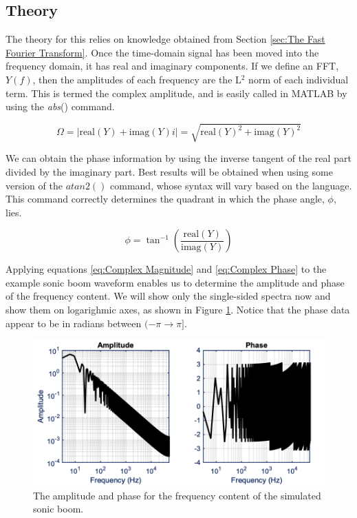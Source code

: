 \subsection{Theory}

The theory for this relies on knowledge obtained from Section \ref{sec:The Fast Fourier Transform}. Once the time-domain signal has been moved into the frequency domain, it has real and imaginary components. If we define an FFT, $Y(f)$, then the amplitudes of each frequency are the L$^2$ norm of each individual term. This is termed the complex amplitude, and is easily called in MATLAB by using the \textit{abs}() command.

\begin{equation} \label{eq:Complex Magnitude}
    \Omega = |\text{real}(Y) + \text{imag}(Y) i| = \sqrt{\text{real}(Y)^2 + \text{imag}(Y)^2}
\end{equation}

We can obtain the phase information by using the inverse tangent of the real part divided by the imaginary part. Best results will be obtained when using some version of the $atan2()$ command, whose syntax will vary based on the language. This command correctly determines the quadrant in which the phase angle, $\phi$, lies.

\begin{equation} \label{eq:Complex Phase}
    \phi = \tan^{-1}\left( \frac{\text{real}(Y)}{\text{imag}(Y)} \right)
\end{equation}

Applying equations \ref{eq:Complex Magnitude} and \ref{eq:Complex Phase} to the example sonic boom waveform enables us to determine the amplitude and phase of the frequency content. We will show only the single-sided spectra now and show them on logarighmic axes, as shown in Figure \ref{fig:Simulated N-Wave Amplitude and Phase}. Notice that the phase data appear to be in radians between $(-\pi \rightarrow \pi]$.

\begin{figure}[H]
    \centering
    \includegraphics[width = 6 in]{Chapters/Signal Processing/Figures/Simulated N-Wave Amplitude and Phase.png}
    \caption{The amplitude and phase for the frequency content of the simulated sonic boom.}
    \label{fig:Simulated N-Wave Amplitude and Phase}
\end{figure}

